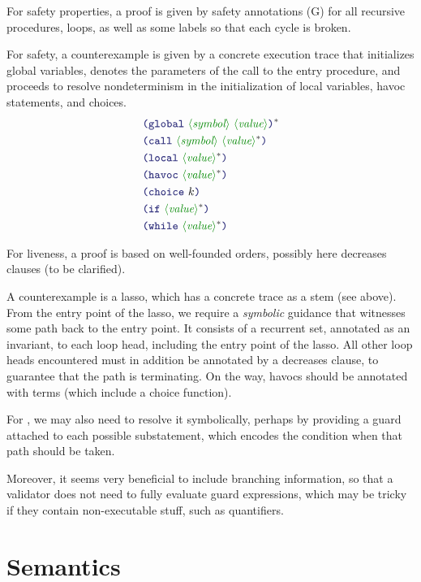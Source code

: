 \documentclass[runningheads]{llncs}
\begin{document}
For safety properties, a proof is given by safety annotations (G)
for all recursive procedures, loops, as well as some labels so that each cycle is broken.

For safety, a counterexample is given by a concrete execution trace
that initializes global variables, denotes the parameters
of the call to the entry procedure,
and proceeds to resolve nondeterminism in the initialization of local variables,
havoc statements, and choices.
\begin{align*}
& \LP \terminal{global}~ \nonterminal{symbol}~\nonterminal{value} \RP\rstar \\
& \LP \terminal{call}~   \nonterminal{symbol}~\nonterminal{value}\rstar \RP \\
& \LP \terminal{local}~  \nonterminal{value}\rstar \RP \\
& \LP \terminal{havoc}~  \nonterminal{value}\rstar \RP \\
& \LP \terminal{choice}~  k \RP \\
& \LP \terminal{if}~     \nonterminal{value}\rstar \RP \\
& \LP \terminal{while}~  \nonterminal{value}\rstar \RP \\
\end{align*}

For liveness, a proof is based on well-founded orders,
possibly here decreases clauses (to be clarified).

A counterexample is a lasso,
which has a concrete trace as a stem (see above).
From the entry point of the lasso,
we require a \emph{symbolic} guidance that witnesses some path
back to the entry point.
It consists of a recurrent set, annotated as an invariant,
to each loop head, including the entry point of the lasso.
All other loop heads encountered must in addition be annotated
by a decreases clause, to guarantee that the path is terminating.
On the way, havocs should be annotated with terms
(which include a choice function).

For , we may also need to resolve it symbolically,
perhaps by providing a guard attached to each possible substatement,
which encodes the condition when that path should be taken.

Moreover, it seems very beneficial to include branching information,
so that a validator does not need to fully evaluate guard expressions,
which may be tricky if they contain non-executable stuff, such as quantifiers.

\section{Semantics}
\end{document}
